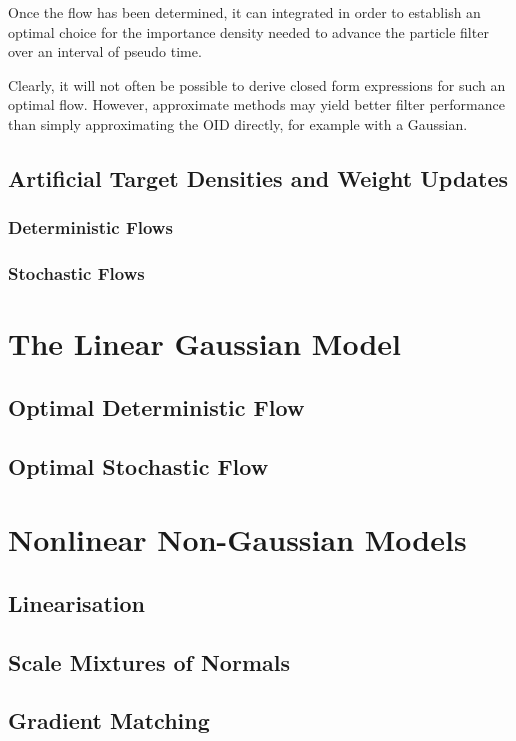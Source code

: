 \documentclass[a4paper,10pt]{article}
\begin{document}
Once the flow has been determined, it can integrated in order to establish an optimal choice for the importance density needed to advance the particle filter over an interval of pseudo time.

Clearly, it will not often be possible to derive closed form expressions for such an optimal flow. However, approximate methods may yield better filter performance than simply approximating the OID directly, for example with a Gaussian.



\subsection{Artificial Target Densities and Weight Updates}
\subsubsection{Deterministic Flows}
\subsubsection{Stochastic Flows}



\section{The Linear Gaussian Model}
\subsection{Optimal Deterministic Flow}
\subsection{Optimal Stochastic Flow}



\section{Nonlinear Non-Gaussian Models}
\subsection{Linearisation}
\subsection{Scale Mixtures of Normals}
\subsection{Gradient Matching}
\end{document}
